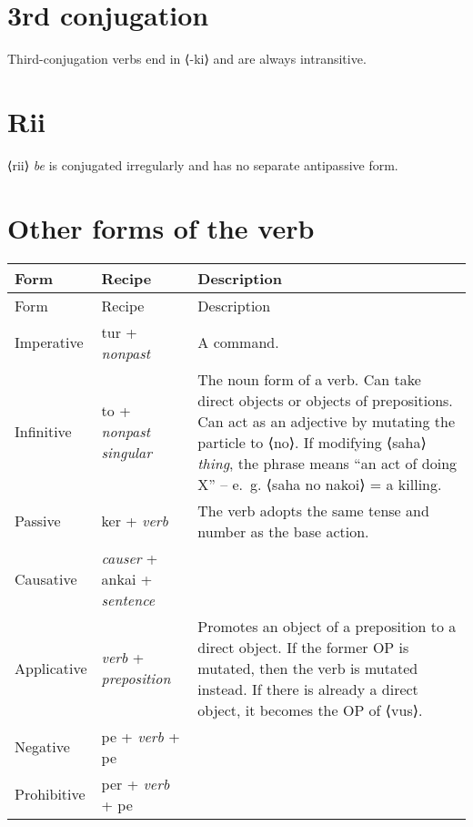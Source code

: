 \documentclass{book}
\newcommand{\ortho}[1]{⟨#1⟩}
\begin{document}

\section{3rd conjugation}

Third-conjugation verbs end in \ortho{-ki} and are always intransitive.


\section{Rii}

\ortho{rii} \emph{be} is conjugated irregularly and has no separate antipassive form.


\section{Other forms of the verb}

\begin{longtabu}[c]{|l|l|X|}
    \hline
    Form & Recipe & Description \\
    \hline
    \endfirsthead
    
    \hline
    Form & Recipe & Description \\
    \hline
    \endhead
    
    \hline
    \endfoot
    
    \hline
    \endlastfoot
    
    Imperative & tur + \emph{nonpast} & A command. \\
    Infinitive & to + \emph{nonpast singular} & The noun form of a verb. Can take direct objects or objects of prepositions. Can act as an adjective by mutating the particle to \ortho{no}. If modifying \ortho{saha} \emph{thing}, the phrase means ``an act of doing X'' -- e.~g. \ortho{saha no nakoi} = a killing. \\
    Passive & ker + \emph{verb} & The verb adopts the same tense and number as the base action. \\
    Causative & \emph{causer} + ankai + \emph{sentence} & \\
    Applicative & \emph{verb} + \emph{preposition} & Promotes an object of a preposition to a direct object. If the former OP is mutated, then the verb is mutated instead. If there is already a direct object, it becomes the OP of \ortho{vus}. \\
    Negative & pe + \emph{verb} + pe & \\
    Prohibitive & per + \emph{verb} + pe & \\
\end{longtabu}
\end{document}
